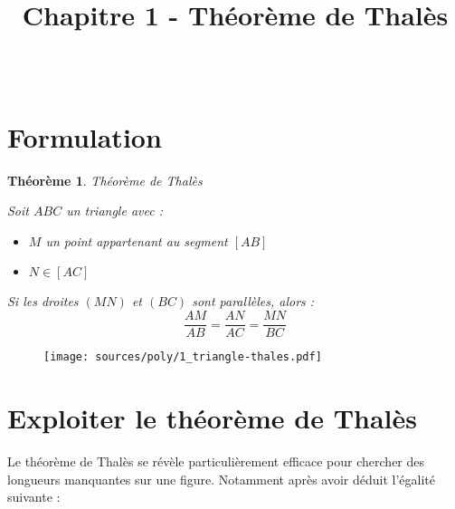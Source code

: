 \documentclass[paper=a4, fontsize=9pt]{scrartcl} %
\title{	
  \vspace{-10ex}
  \horrule{0.5pt} \\[0.4cm] %
  \huge Chapitre 1 - Théorème de Thalès \\ %
  \horrule{2pt} \\[0.5cm] %
}
\author{}
\date{\vspace{-10ex}} %
\begin{document}

\newtheorem{Definition}{Définition}
\newtheorem{Theorem}{Théorème}
\newtheorem{Proposition}{Propriété}

\renewcommand{\labelitemi}{$\bullet$}
\renewcommand{\labelitemii}{$\circ$}

\maketitle %
\setlength{\columnseprule}{1pt}

\section{Formulation}

\begin{multicols}{2}

\begin{Theorem}{Théorème de Thalès}

Soit $ABC$ un triangle avec : 
\begin{itemize}
\item $M$ un point appartenant au segment $[AB]$
\item $N \in [AC]$
\end{itemize}
Si les droites $(MN)$ et $(BC)$ sont parallèles, alors :
$$\dfrac{AM}{AB} = \dfrac{AN}{AC} = \dfrac{MN}{BC}$$

\end{Theorem}

\begin{figure}[H]
  \centering
  \texttt{[image: sources/poly/1\_triangle-thales.pdf]}
\end{figure}

\end{multicols}

\section{Exploiter le théorème de Thalès}


Le théorème de Thalès se révèle particulièrement efficace pour chercher des longueurs manquantes sur une figure. Notamment après avoir déduit l'égalité suivante :
\end{document}

